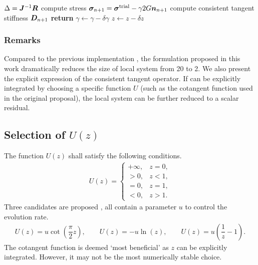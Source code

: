\begin{breakablealgorithm}
\begin{algorithmic}[1]
        \State $\Delta=\bm{J}^{-1}\bm{R}$
        \State compute stress $\bm{\sigma}_{n+1}=\bm{\sigma}^\text{trial}-\gamma2G\bm{n}_{n+1}$
        \State compute consistent tangent stiffness $\bm{D}_{n+1}$
        \State \textbf{return}
        \EndIf
        \State $\gamma\leftarrow\gamma-\delta\gamma$
        \State $z\leftarrow{}z-\delta{}z$
        \EndWhile
    \end{algorithmic}
\end{breakablealgorithm}
\subsubsection{Remarks}
Compared to the previous implementation \citep{Anjiki2019}, the formulation proposed in this work dramatically reduces the size of local system from \num{20} to \num{2}.
We also present the explicit expression of the consistent tangent operator.
If  can be explicitly integrated by choosing a specific function $U$ (such as the cotangent function used in the original proposal), the local system can be further reduced to a scalar residual.
\subsection{Selection of $U\left(z\right)$}
The function $U\left(z\right)$ shall satisfy the following conditions.
\begin{gather}
    U\left(z\right)=\left\{
    \begin{array}{ll}
        +\infty, & z=0, \\
        >0,      & z<1, \\
        =0,      & z=1, \\
        <0,      & z>1.
    \end{array}\right.
\end{gather}
Three candidates are proposed \citep{Hashiguchi2017}, all contain a parameter $u$ to control the evolution rate.
\begin{gather}
    U\left(z\right)=u\cot\left(\dfrac{\pi}{2}z\right),\qquad
    U\left(z\right)=-u\ln\left(z\right),\qquad
    U\left(z\right)=u\left(\dfrac{1}{z}-1\right).
\end{gather}
The cotangent function is deemed `most beneficial' as $z$ can be explicitly integrated.
However, it may not be the most numerically stable choice.

